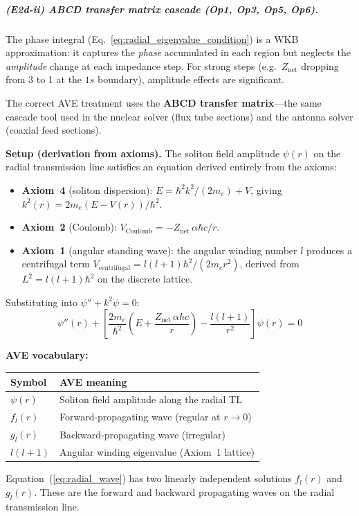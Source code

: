 \subparagraph{(E2d-ii) ABCD transfer matrix cascade
(Op1, Op3, Op5, Op6).}

The phase integral
(Eq.~\ref{eq:radial_eigenvalue_condition}) is a
WKB approximation: it captures the \emph{phase}
accumulated in each region but neglects the
\emph{amplitude} change at each impedance step.
For strong steps (e.g.\ $Z_{\text{net}}$ dropping
from 3 to 1 at the $1s$ boundary), amplitude
effects are significant.

The correct AVE treatment uses the \textbf{ABCD
transfer matrix}---the same cascade tool used in
the nuclear solver (flux tube sections) and the
antenna solver (coaxial feed sections).

\noindent\textbf{Setup (derivation from axioms).}
The soliton field amplitude $\psi(r)$ on the radial
transmission line satisfies an equation derived
entirely from the axioms:
\begin{itemize}
    \item \textbf{Axiom~4} (soliton dispersion):
          $E = \hbar^2 k^2/(2m_e) + V$, giving
          $k^2(r) = 2m_e(E - V(r))/\hbar^2$.
    \item \textbf{Axiom~2} (Coulomb):
          $V_{\text{Coulomb}} = -Z_{\text{net}}\,
          \alpha\hbar c / r$.
    \item \textbf{Axiom~1} (angular standing wave):
          the angular winding number $l$ produces a
          centrifugal term
          $V_{\text{centrifugal}} = l(l+1)\hbar^2
          /(2m_e r^2)$, derived from
          $L^2 = l(l+1)\hbar^2$ on the discrete
          lattice.
\end{itemize}
Substituting into $\psi'' + k^2 \psi = 0$:
\begin{equation}
    \psi''(r) + \left[
    \frac{2m_e}{\hbar^2}
    \left(E + \frac{Z_{\text{net}}\,\alpha\hbar c}{r}\right)
    - \frac{l(l+1)}{r^2}\right]\psi(r) = 0
    \label{eq:radial_wave}
\end{equation}

\noindent\textbf{AVE vocabulary:}
\begin{center}
\small
\renewcommand{\arraystretch}{1.2}
\begin{tabular}{ll}
\hline
\textbf{Symbol} & \textbf{AVE meaning} \\
\hline
$\psi(r)$ & Soliton field amplitude along the
    radial TL \\
$f_l(r)$  & Forward-propagating wave (regular at
    $r \to 0$) \\
$g_l(r)$  & Backward-propagating wave (irregular) \\
$l(l+1)$  & Angular winding eigenvalue (Axiom~1
    lattice) \\
\hline
\end{tabular}
\end{center}
Equation~(\ref{eq:radial_wave}) has two linearly
independent solutions $f_l(r)$ and $g_l(r)$.
These are the forward and backward propagating
waves on the radial transmission line.

